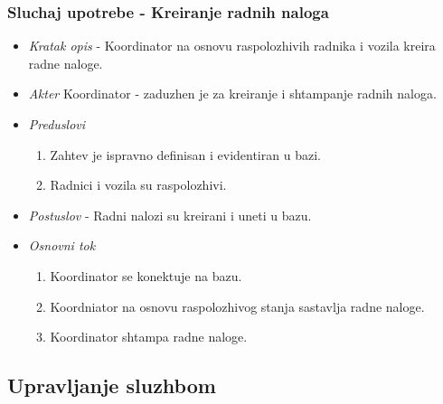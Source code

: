 \documentclass[10 pt]{article}
\begin{document}
	
	\subsubsection{Sluchaj upotrebe - Kreiranje radnih naloga}
	
		\begin{itemize}
		
			\item\textit{Kratak opis} - Koordinator na osnovu raspolozhivih radnika i vozila kreira radne naloge.
			
			\item\textit{Akter} Koordinator - zaduzhen je za kreiranje i shtampanje radnih naloga.
			
			\item\textit{Preduslovi}
				\begin{enumerate}
					\item Zahtev je ispravno definisan i evidentiran u bazi.
					\item Radnici i vozila su raspolozhivi.
				\end{enumerate}
			
			\item\textit{Postuslov} - Radni nalozi su kreirani i uneti u bazu.
			
			\item\textit{Osnovni tok}
				\begin{enumerate}
					\item Koordinator se konektuje na bazu.
					\item Koordniator na osnovu raspolozhivog stanja sastavlja radne naloge.
					\item Koordinator shtampa radne naloge.
				\end{enumerate}
			
		\end{itemize}
	
	
	\subsection{Upravljanje sluzhbom}
	
\end{document}
